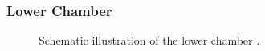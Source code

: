 \documentclass[a4paper,12pt,twoside]{article}
\begin{document}
            
\subsubsection{Lower Chamber}
\label{LCchap}
	\begin{figure}[H]
		\caption{Schematic illustration of the lower chamber \cite{UB}.}
		    \label{lower}
	\end{figure}
%
\end{document}
